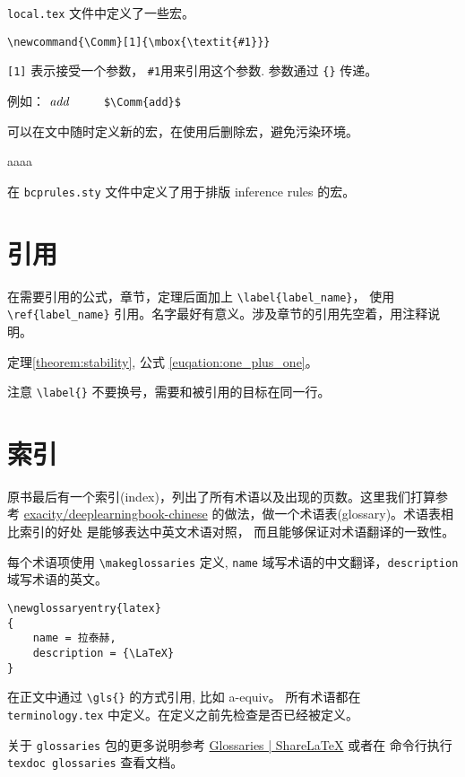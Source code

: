 \texttt{local.tex} 文件中定义了一些宏。

\begin{verbatim}
\newcommand{\Comm}[1]{\mbox{\textit{#1}}}
\end{verbatim}

\texttt{[1]} 表示接受一个参数， \texttt{\#1}用来引用这个参数. 参数通过 \texttt{\{\}} 传递。

例如： $\Comm{add}$  $\qquad$ \vspace{1cm} \verb!$\Comm{add}$!

可以在文中随时定义新的宏，在使用后删除宏，避免污染环境。

\newcommand{\aaaa}{aaaa}
\aaaa
\let\aaaa\undefined

在 \texttt{bcprules.sty} 文件中定义了用于排版 inference rules 的宏。


\section{引用}

在需要引用的公式，章节，定理后面加上 \verb!\label{label_name}!， 使用 \verb!\ref{label_name}!
引用。名字最好有意义。涉及章节的引用先空着，用注释说明。

定理\ref{theorem:stability}, 公式 \ref{euqation:one_plus_one}。

注意 \verb!\label{}! 不要换号，需要和被引用的目标在同一行。

\section{索引}

原书最后有一个索引(index)，列出了所有术语以及出现的页数。这里我们打算参考
\href{https://github.com/exacity/deeplearningbook-chinese}
{exacity/deeplearningbook-chinese} 的做法，做一个术语表(glossary)。术语表相比索引的好处
是能够表达中英文术语对照， 而且能够保证对术语翻译的一致性。

每个术语项使用 \verb!\makeglossaries! 定义, \texttt{name} 域写术语的中文翻译，\texttt{description}
域写术语的英文。

\begin{verbatim}
\newglossaryentry{latex}
{
    name = 拉泰赫,
    description = {\LaTeX}
}
\end{verbatim}

在正文中通过 \verb!\gls{}! 的方式引用, 比如 \gls{a-equiv}。 所有术语都在 \texttt{terminology.tex}
中定义。在定义之前先检查是否已经被定义。

关于 \texttt{glossaries} 包的更多说明参考
\href{https://www.sharelatex.com/learn/Glossaries}{Glossaries | ShareLaTeX} 或者在
命令行执行 \texttt{texdoc glossaries} 查看文档。
